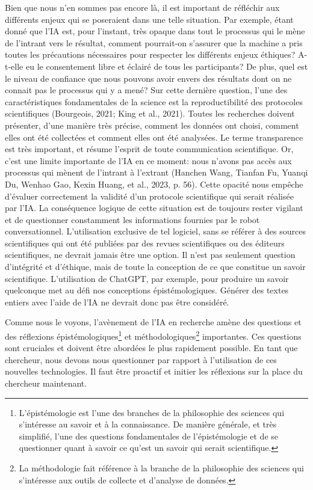 \documentclass[
  letterpaper,
  DIV=11,
  numbers=noendperiod]{scrreprt}
\begin{document}
Bien que nous n'en sommes pas encore là, il est important de réfléchir
aux différents enjeux qui se poseraient dans une telle situation. Par
exemple, étant donné que l'IA est, pour l'instant, très opaque dans tout
le processus qui le mène de l'intrant vers le résultat, comment
pourrait-on s'assurer que la machine a pris toutes les précautions
nécessaires pour respecter les différents enjeux éthiques? A-t-elle eu
le consentement libre et éclairé de tous les participants? De plus, quel
est le niveau de confiance que nous pouvons avoir envers des résultats
dont on ne connait pas le processus qui y a mené? Sur cette dernière
question, l'une des caractéristiques fondamentales de la science est la
reproductibilité des protocoles scientifiques (Bourgeois, 2021; King et
al., 2021). Toutes les recherches doivent présenter, d'une manière très
précise, comment les données ont choisi, comment elles ont été
collectées et comment elles ont été analysées. Le terme transparence est
très important, et résume l'esprit de toute communication scientifique.
Or, c'est une limite importante de l'IA en ce moment: nous n'avons pas
accès aux processus qui mènent de l'intrant à l'extrant (Hanchen Wang,
Tianfan Fu, Yuanqi Du, Wenhao Gao, Kexin Huang, et al., 2023, p. 56).
Cette opacité nous empêche d'évaluer correctement la validité d'un
protocole scientifique qui serait réalisée par l'IA. La conséquence
logique de cette situation est de toujours rester vigilant et de
questionner constamment les informations fournies par le robot
conversationnel. L'utilisation exclusive de tel logiciel, sans se
référer à des sources scientifiques qui ont été publiées par des revues
scientifiques ou des éditeurs scientifiques, ne devrait jamais être une
option. Il n'est pas seulement question d'intégrité et d'éthique, mais
de toute la conception de ce que constitue un savoir scientifique.
L'utilisation de ChatGPT, par exemple, pour produire un savoir
quelconque met au défi nos conceptions épistémologiques. Générer des
textes entiers avec l'aide de l'IA ne devrait donc pas être considéré.

Comme nous le voyons, l'avènement de l'IA en recherche amène des
questions et des réflexions épistémologiques\footnote{L'épistémologie
  est l'une des branches de la philosophie des sciences qui s'intéresse
  au savoir et à la connaissance. De manière générale, et très
  simplifié, l'une des questions fondamentales de l'épistémologie et de
  se questionner quant à savoir ce qu'est un savoir qui serait
  scientifique.} et méthodologiques\footnote{La méthodologie fait
  référence à la branche de la philosophie des sciences qui s'intéresse
  aux outils de collecte et d'analyse de données.} importantes. Ces
questions sont cruciales et doivent être abordées le plus rapidement
possible. En tant que chercheur, nous devons nous questionner par
rapport à l'utilisation de ces nouvelles technologies. Il faut être
proactif et initier les réflexions sur la place du chercheur maintenant.
\end{document}
